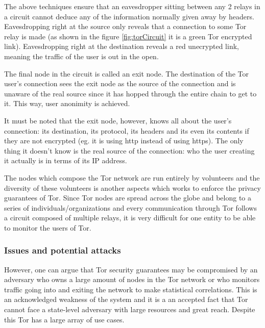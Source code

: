 \documentclass[11pt]{article} %
\begin{document}
The above techniques ensure that an eavesdropper sitting between any 2 relays in a circuit cannot deduce any of the information normally given away by headers. Eavesdropping right at the source  only reveals that a connection to some Tor relay is made (as shown in the figure \ref{fig:torCircuit} it is a green Tor encrypted link). Eavesdropping right at the destination reveals a red unecrypted link, meaning the traffic of the user is out in the open.


The final node in the circuit is called an exit node. The destination of the Tor user's connection sees the exit node as the source of the connection and is unaware of the real source since it has hopped through the entire chain to get to it. This way, user anonimity is achieved.

It must be noted that the exit node, however, knows all about the user's connection: its destination, its protocol, its headers and its even its contents if they are not encrypted (eg. it is using http instead of using https). The only thing it doesn't know is the real source of the connection: who the user creating it actually is in terms of its IP address. 


The nodes which compose the Tor network are run entirely by volunteers and the diversity of these volunteers is another aspects which works to enforce the privacy guarantees of Tor. Since Tor nodes are spread across the globe and belong to a series of individuals/organizations and every communication through Tor follows a circuit composed of multiple relays, it is very difficult for one entity to be able to monitor the users of Tor.

\subsubsection{Issues and potential attacks}

However, one can argue that Tor security guarantees may be compromised by an adversary who owns a large amount of nodes in the Tor network or who monitors traffic going into and exiting the network to make statistical correlations. This is an acknowledged weakness of the system and it is a an accepted fact that Tor cannot face a state-level adversary with large resources and great reach. Despite this Tor has a large array of use cases.
\end{document}
